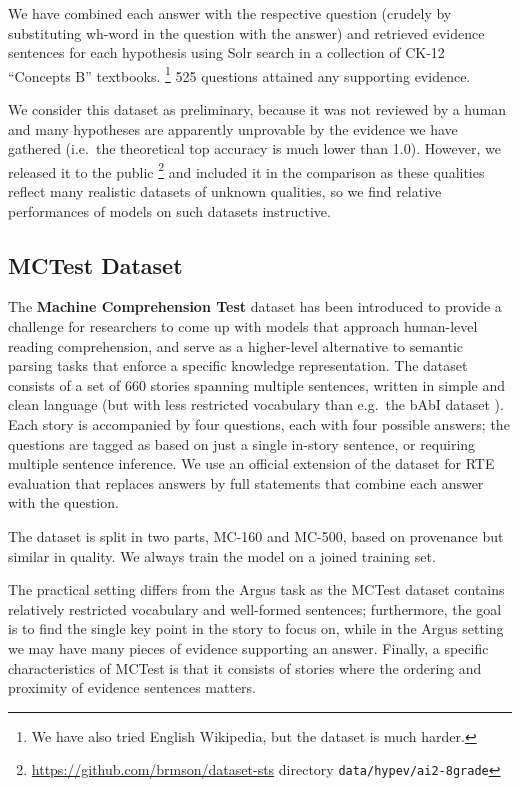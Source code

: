 \documentclass[11pt]{article}
\begin{document}
We have combined each answer with the respective question (crudely by
substituting wh-word in the question with the answer) and retrieved
evidence sentences for each hypothesis using Solr search in a collection
of CK-12 ``Concepts B'' textbooks.%
\footnote{We have also tried English Wikipedia, but the dataset is much harder.}
525 questions attained any supporting evidence.

We consider this dataset as preliminary, because it was not reviewed
by a human and many hypotheses are apparently unprovable by the evidence
we have gathered (i.e.\ the theoretical top accuracy is much lower
than 1.0).  However, we released it to the public%
\footnote{\url{https://github.com/brmson/dataset-sts} directory \texttt{data/hypev/ai2-8grade}}
and included it in the comparison as these
qualities reflect many realistic datasets of unknown qualities, so
we find relative performances of models on such datasets instructive.


\subsection{MCTest Dataset}

The \textbf{Machine Comprehension Test} \cite{MCTest} dataset has been introduced
to provide a challenge for researchers to come up with models that approach
human-level reading comprehension, and serve as a higher-level alternative
to semantic parsing tasks that enforce a specific knowledge representation.
The dataset consists of a set of 660 stories spanning
multiple sentences, written in simple and clean language (but with less restricted
vocabulary than e.g.\ the bAbI dataset \cite{bAbI}).  Each story is accompanied
by four questions, each with four possible answers; the questions are tagged
as based on just a single in-story sentence, or requiring multiple sentence inference.
We use an official extension of the dataset for RTE evaluation
that replaces answers by full statements that combine each answer with the question.

The dataset is split in two parts, MC-160 and MC-500, based on provenance but
similar in quality.
We always train the model on a joined training set.

The practical setting differs from the Argus task as the MCTest dataset contains
relatively restricted vocabulary and well-formed sentences; furthermore,
the goal is to find the single key point in the story to focus on, while
in the Argus setting we may have many pieces of evidence supporting an answer.
Finally, a specific characteristics of MCTest is that it consists of stories
where the ordering and proximity of evidence sentences matters.
\end{document}
